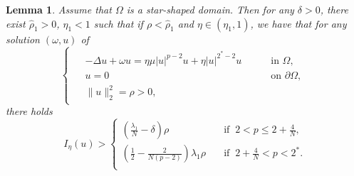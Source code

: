 \documentclass[10pt]{article}
\numberwithin{equation}{section}
\newtheorem{lemma}[theorem]{Lemma}
\numberwithin{equation}{section}
\begin{document}
\begin{lemma}\label{2509121227}
Assume that $\Omega$ is a star-shaped domain. Then for any $\delta>0$, there exist $\widehat{\rho}_1>0$, $\eta_1<1$ such that  if $\rho<\widehat{\rho}_1$ and $\eta\in (\eta_1, 1)$,  we have that for any solution  $(\omega, u)$ of \begin{equation}\label{0410031}
\begin{cases}
\begin{aligned}
&-\Delta u+\omega u=\eta\mu |u|^{p-2}u+\eta |u|^{2^*-2}u \quad &&\text { in } \Omega, \\
&u=0  &&\text { on } \partial\Omega, \\
&\|u\|_2^2=\rho>0,
\end{aligned}
\end{cases}
\end{equation}
there holds
\[
I_\eta(u)>
\begin{cases}
\left(\frac{\lambda_1}{N}-\delta\right)\rho\quad&\mbox{if}\;\; 2<p\le 2+\frac{4}{N},\\
\left(\frac{1}{2}-\frac{2}{N(p-2)}\right)\lambda_1\rho\quad&\mbox{if}\;\; 2+\frac{4}{N}<p<2^*.\\
\end{cases}
\]
\end{lemma}
\end{document}
